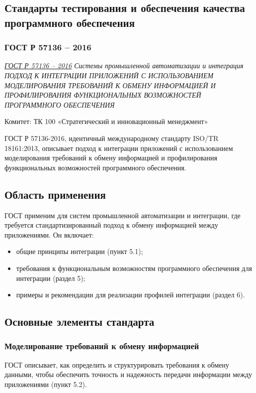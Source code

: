 \subsection{Стандарты тестирования и обеспечения качества программного обеспечения}

\subsubsection{ГОСТ Р 57136 -- 2016}

\emph{\href{https://meganorm.ru/Data2/1/4293751/4293751436.pdf}{ГОСТ Р 57136 -- 2016}
Системы промышленной автоматизации
и интеграция
ПОДХОД К ИНТЕГРАЦИИ ПРИЛОЖЕНИЙ
С ИСПОЛЬЗОВАНИЕМ МОДЕЛИРОВАНИЯ
ТРЕБОВАНИЙ К ОБМЕНУ ИНФОРМАЦИЕЙ
И ПРОФИЛИРОВАНИЯ ФУНКЦИОНАЛЬНЫХ
ВОЗМОЖНОСТЕЙ ПРОГРАММНОГО
ОБЕСПЕЧЕНИЯ
}
\par
Комитет: ТК 100 «Стратегический и инновационный менеджмент»

ГОСТ Р 57136-2016, идентичный международному стандарту ISO/TR 18161:2013, описывает подход к интеграции приложений
с использованием моделирования требований к обмену информацией и профилирования функциональных возможностей программного обеспечения.


\subsection*{Область применения}
ГОСТ применим для систем промышленной автоматизации и интеграции, где требуется стандартизированный подход к обмену информацией между приложениями. Он включает:
\begin{itemize}
    \item общие принципы интеграции (пункт 5.1);
    \item требования к функциональным возможностям программного обеспечения для интеграции (раздел 5);
    \item примеры и рекомендации для реализации профилей интеграции (раздел 6).
\end{itemize}

\subsection*{Основные элементы стандарта}
\subsubsection*{Моделирование требований к обмену информацией}
ГОСТ описывает, как определить и структурировать требования к обмену данными, чтобы обеспечить точность и надежность передачи информации между приложениями (пункт 5.2).

